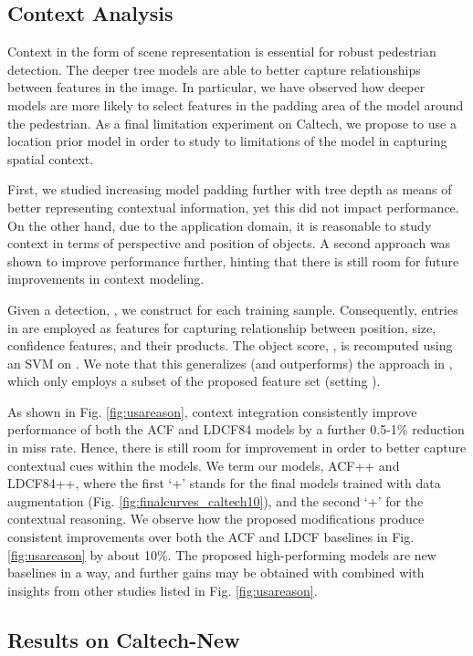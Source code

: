 \documentclass[a4paper,conference]{IEEEtran_icpr}
\begin{document}
\subsection{Context Analysis}

Context in the form of scene representation is essential for robust pedestrian detection. The deeper tree models are able to better capture relationships between features in the image. In particular, we have observed how deeper models are more likely to select features in the padding area of the model around the pedestrian. As a final limitation experiment on Caltech, we propose to use a location prior model in order to study to limitations of the model in capturing spatial context. 

First, we studied increasing model padding further with tree depth as means of better representing contextual information, yet this did not impact performance. On the other hand, due to the application domain, it is reasonable to study context in terms of perspective and position of objects. A second approach was shown to improve performance further, hinting that there is still room for future improvements in context modeling.

Given a detection, , we construct  for each training sample. Consequently, entries in  are employed as features for capturing relationship between position, size, confidence features, and their products. The object score, , is recomputed using an SVM \cite{svm} on . We note that this generalizes (and outperforms) the approach in \cite{multires}, which only employs a subset of the proposed  feature set (setting ). 




As shown in Fig. \ref{fig:usareason}, context integration consistently improve performance of both the ACF and LDCF84 models by a further 0.5-1\% reduction in miss rate. Hence, there is still room for improvement in order to better capture contextual cues within the models. We term our models, ACF++ and LDCF84++, where the first `+' stands for the final models trained with data augmentation (Fig. \ref{fig:finalcurves_caltech10}), and the second `+' for the contextual reasoning. We observe how the proposed modifications produce consistent improvements over both the ACF and LDCF baselines in Fig. \ref{fig:usareason} by about 10\%. The proposed high-performing models are new baselines in a way, and further gains may be obtained with combined with insights from other studies listed in Fig. \ref{fig:usareason}. 

\subsection{Results on Caltech-New}
\end{document}
